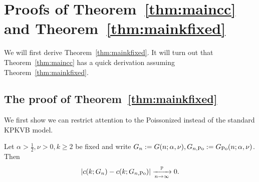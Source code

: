 


\section{Proofs of Theorem~\ref{thm:maincc} and Theorem~\ref{thm:mainkfixed}\label{sec:proofs_fixed_k}}


We will first derive Theorem~\ref{thm:mainkfixed}. It will turn out that Theorem~\ref{thm:maincc} has a quick derivation
assuming Theorem~\ref{thm:mainkfixed}.



\subsection{The proof of Theorem~\ref{thm:mainkfixed}}



We first show we can restrict attention to the Poissonized instead of the standard KPKVB model.

\begin{lemma} Let $\alpha>\frac12,\nu>0, k\geq 2$ be fixed and write $G_n := G(n;\alpha,\nu), G_{n,\text{Po}} := G_{\text{Po}}(n;\alpha,\nu)$.
Then 
\[
	\left|c(k; G_n)-c(k; G_{n,\text{Po}})\right| \xrightarrow[n\to\infty]{\mathbb{P}} 0.
\]
\end{lemma}

